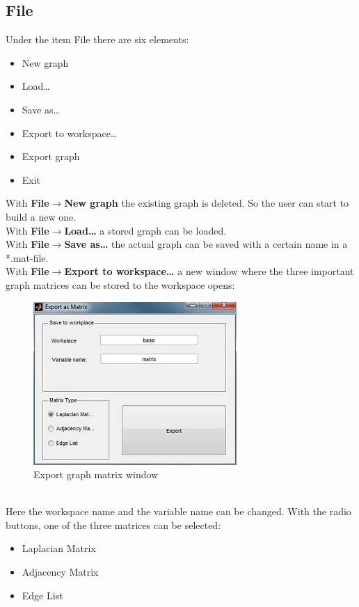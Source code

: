 \documentclass[12pt]{report}
\begin{document}
\subsection{File}
Under the item File there are six elements:
\begin{itemize}
	\item New graph
	\item Load\dots
	\item Save as\dots
	\item Export to workspace\dots
	\item Export graph
	\item Exit
\end{itemize}
With \textbf{File$\rightarrow$New graph} the existing graph is deleted. So the user can start to build a new one.\\
With \textbf{File$\rightarrow$Load\dots} a stored graph can be loaded.\\
With \textbf{File$\rightarrow$Save as\dots} the actual graph can be saved with a certain name in a *.mat-file.\\
With \textbf{File$\rightarrow$Export to workspace\dots} a new window where the three important graph matrices can be stored to the workspace opens:\\
\begin{figure}[here]
\centering
\includegraphics[scale=.6]{exportworkspace}
\caption{Export graph matrix window}
\label{FIG:abb8}
\end{figure}
\\
Here the workspace name and the variable name can be changed. With the radio buttons, one of the three matrices can be selected:
\begin{itemize}
	\item Laplacian Matrix
	\item Adjacency Matrix
	\item Edge List
\end{itemize}
\end{document}
